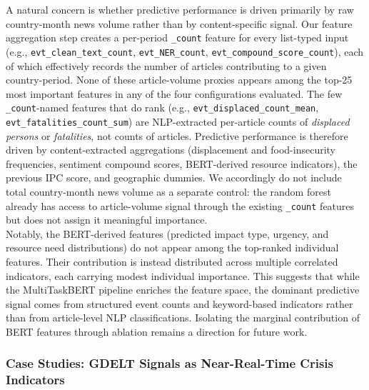 \documentclass{article}
\begin{document}
A natural concern is whether predictive performance is driven primarily by raw country-month news volume rather than by content-specific signal. Our feature aggregation step creates a per-period \texttt{\_count} feature for every list-typed input (e.g., \texttt{evt\_clean\_text\_count}, \texttt{evt\_NER\_count}, \texttt{evt\_compound\_score\_count}), each of which effectively records the number of articles contributing to a given country-period. None of these article-volume proxies appears among the top-25 most important features in any of the four configurations evaluated. The few \texttt{\_count}-named features that do rank (e.g., \texttt{evt\_displaced\_count\_mean},  \\ \texttt{evt\_fatalities\_count\_sum}) are NLP-extracted per-article counts of \emph{displaced persons} or \emph{fatalities}, not counts of articles. Predictive performance is therefore driven by content-extracted aggregations (displacement and food-insecurity frequencies, sentiment compound scores, BERT-derived resource indicators), the previous IPC score, and geographic dummies. We accordingly do not include total country-month news volume as a separate control: the random forest already has access to article-volume signal through the existing \texttt{\_count} features but does not assign it meaningful importance. \\

Notably, the BERT-derived features (predicted impact type, urgency, and resource need distributions) do not appear among the top-ranked individual features. Their contribution is instead distributed across multiple correlated indicators, each carrying modest individual importance. This suggests that while the MultiTaskBERT pipeline enriches the feature space, the dominant predictive signal comes from structured event counts and keyword-based indicators rather than from article-level NLP classifications. Isolating the marginal contribution of BERT features through ablation remains a direction for future work.

\subsubsection{Case Studies: GDELT Signals as Near-Real-Time Crisis Indicators}
\end{document}
